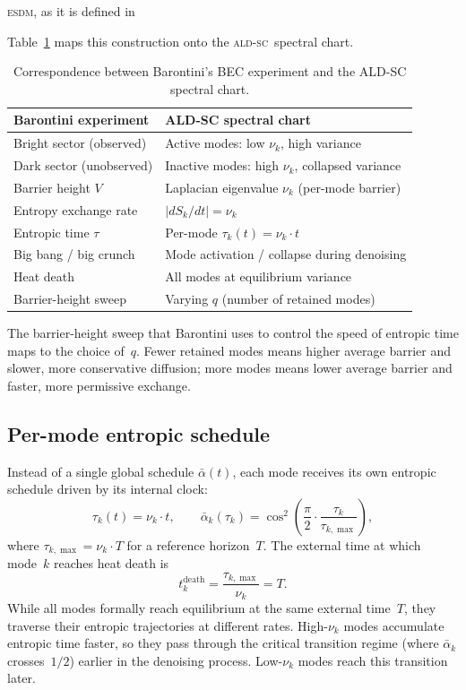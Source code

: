 \documentclass[11pt]{article}
\newcommand{\ESDM}{\textsc{esdm}}
\newcommand{\ALDSC}{\textsc{ald-sc}}
\begin{document}
\ESDM, as it is defined in 

Table~\ref{tab:barontini} maps this construction onto the \ALDSC~spectral
chart.

\begin{table}[ht]
\centering
\small
\caption{Correspondence between Barontini's BEC experiment and the ALD-SC
spectral chart.}
\label{tab:barontini}
\begin{tabular}{ll}
\toprule
\textbf{Barontini experiment} & \textbf{ALD-SC spectral chart} \\
\midrule
Bright sector (observed) & Active modes: low \(\nu_k\), high variance \\
Dark sector (unobserved) & Inactive modes: high \(\nu_k\), collapsed variance \\
Barrier height \(V\) & Laplacian eigenvalue \(\nu_k\) (per-mode barrier) \\
Entropy exchange rate & \(|dS_k/dt| = \nu_k\) \\
Entropic time \(\tau\) & Per-mode \(\tau_k(t) = \nu_k \cdot t\) \\
Big bang / big crunch & Mode activation / collapse during denoising \\
Heat death & All modes at equilibrium variance \\
Barrier-height sweep & Varying \(q\) (number of retained modes) \\
\bottomrule
\end{tabular}
\end{table}

The barrier-height sweep that Barontini uses to control the speed of entropic
time maps to the choice of~\(q\). Fewer retained modes means higher average
barrier and slower, more conservative diffusion; more modes means lower
average barrier and faster, more permissive exchange.

\subsection{Per-mode entropic schedule}
\label{sec:per_mode_schedule}

Instead of a single global schedule \(\bar\alpha(t)\), each mode receives its
own entropic schedule driven by its internal clock:
\[\tau_k(t) = \nu_k \cdot t, \qquad \bar\alpha_k(\tau_k) = \cos^2\!\left(\frac{\pi}{2}\cdot\frac{\tau_k}{\tau_{k,\max}}\right),\]
where \(\tau_{k,\max} = \nu_k \cdot T\) for a reference horizon~\(T\).
The external time at which mode~\(k\) reaches heat death is
\[t_k^{\mathrm{death}} = \frac{\tau_{k,\max}}{\nu_k} = T.\]
While all modes formally reach equilibrium at the same external time~\(T\),
they traverse their entropic trajectories at different rates. High-\(\nu_k\)
modes accumulate entropic time faster, so they pass through the critical
transition regime (where \(\bar\alpha_k\) crosses~\(1/2\)) earlier in the
denoising process. Low-\(\nu_k\) modes reach this transition later.
\end{document}
